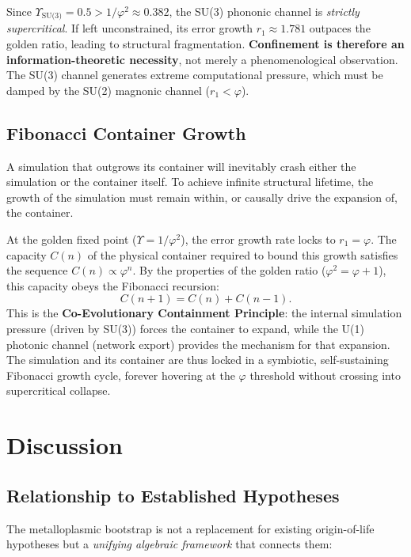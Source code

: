 \documentclass[12pt]{article}
\theoremstyle{principia}
\theoremstyle{definition}
\theoremstyle{remark}
\providecommand{\vp}{\varphi}
\begin{document}
Since $\Upsilon_{\text{SU(3)}} = 0.5 > 1/\vp^2 \approx 0.382$, the SU(3) phononic channel is \emph{strictly supercritical}. If left unconstrained, its error growth $r_1 \approx 1.781$ outpaces the golden ratio, leading to structural fragmentation. \textbf{Confinement is therefore an information-theoretic necessity}, not merely a phenomenological observation. The SU(3) channel generates extreme computational pressure, which must be damped by the SU(2) magnonic channel ($r_1 < \vp$).

\subsection{Fibonacci Container Growth}

A simulation that outgrows its container will inevitably crash either the simulation or the container itself. To achieve infinite structural lifetime, the growth of the simulation must remain within, or causally drive the expansion of, the container.

At the golden fixed point ($\Upsilon = 1/\vp^2$), the error growth rate locks to $r_1 = \vp$. The capacity $C(n)$ of the physical container required to bound this growth satisfies the sequence $C(n) \propto \vp^n$. By the properties of the golden ratio ($\vp^2 = \vp + 1$), this capacity obeys the Fibonacci recursion:
\begin{equation}
    C(n+1) = C(n) + C(n-1).
\end{equation}
This is the \textbf{Co-Evolutionary Containment Principle}: the internal simulation pressure (driven by SU(3)) forces the container to expand, while the U(1) photonic channel (network export) provides the mechanism for that expansion. The simulation and its container are thus locked in a symbiotic, self-sustaining Fibonacci growth cycle, forever hovering at the $\vp$ threshold without crossing into supercritical collapse.

\section{Discussion}\label{sec:disc}

\subsection{Relationship to Established Hypotheses}

The metalloplasmic bootstrap is not a replacement for existing origin-of-life hypotheses but a \emph{unifying algebraic framework} that connects them:
\end{document}
